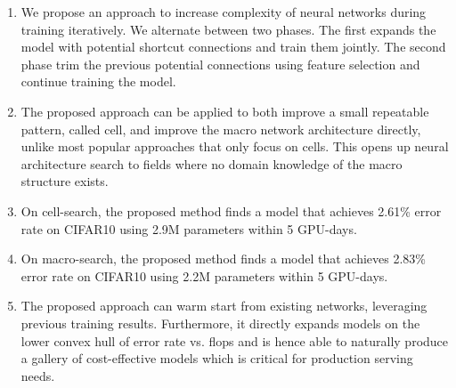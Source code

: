 \begin{enumerate}[resume]
\item We propose an approach to increase complexity of neural networks during training iteratively. We alternate between two phases. The first expands the model with potential shortcut connections and train them jointly. The second phase trim the previous potential connections using feature selection and continue training the model. 
\item The proposed approach can be applied to both improve a small repeatable pattern, called cell, and improve the macro network architecture directly, unlike most popular approaches that only focus on cells. This opens up neural architecture search to fields where no domain knowledge of the macro structure exists. 
\item On cell-search, the proposed method finds a model that achieves 2.61\% error rate on CIFAR10 using 2.9M parameters within 5 GPU-days. 
\item On macro-search, the proposed method finds a model that achieves 2.83\% error rate on CIFAR10 using 2.2M parameters within 5 GPU-days. 
\item The proposed approach can warm start from existing networks, leveraging previous training results. Furthermore, it directly expands models on the lower convex hull of error rate vs. flops and is hence able to naturally produce a gallery of cost-effective models which is critical for production serving needs. 
\end{enumerate}



